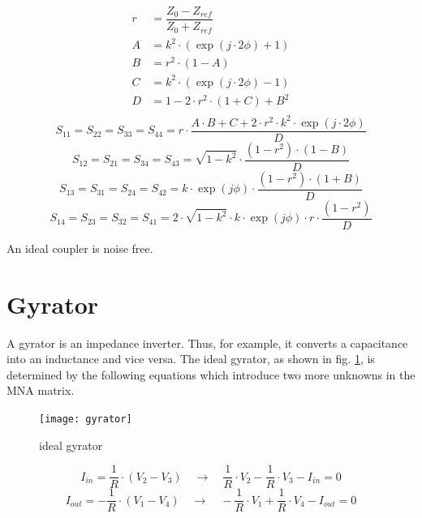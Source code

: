 \begin{align}
r &= \dfrac{Z_0-Z_{ref}}{Z_0+Z_{ref}} \\
A &= k^2 \cdot \left( \exp\left(j\cdot 2\phi\right)+1 \right) \\
B &= r^2 \cdot \left(1-A\right) \\
C &= k^2 \cdot \left( \exp\left(j\cdot 2\phi\right)-1 \right) \\
D &= 1 - 2\cdot r^2\cdot \left(1+C\right) + B^2 \\
\end{align}
\begin{equation}
S_{11} = S_{22} = S_{33} = S_{44} = r\cdot\dfrac{A\cdot B + C + 2\cdot r^2\cdot k^2\cdot\exp\left(j\cdot 2\phi\right)}{D}
\end{equation}
\begin{equation}
S_{12} = S_{21} = S_{34} = S_{43} = \sqrt{1-k^2}\cdot \dfrac{\left(1-r^2\right)\cdot \left(1-B\right)}{D}
\end{equation}
\begin{equation}
S_{13} = S_{31} = S_{24} = S_{42} = k\cdot\exp\left(j\phi\right)\cdot \dfrac{\left(1-r^2\right)\cdot \left(1+B\right)}{D}
\end{equation}
\begin{equation}
S_{14} = S_{23} = S_{32} = S_{41} = 2\cdot\sqrt{1-k^2}\cdot k\cdot\exp\left(j\phi\right)\cdot r\cdot \dfrac{\left(1-r^2\right)}{D}
\end{equation}

An ideal coupler is noise free.


\section{Gyrator}

A gyrator is an impedance inverter.  Thus, for example, it converts a
capacitance into an inductance and vice versa.
The ideal gyrator, as shown in fig. \ref{fig:gyrator}, is determined
by the following equations which introduce two more unknowns in the
MNA matrix.

\begin{figure}[ht]
\begin{center}
\texttt{[image: gyrator]}
\end{center}
\caption{ideal gyrator}
\label{fig:gyrator}
\end{figure}
\FloatBarrier

\begin{equation}
I_{in} = \frac{1}{R}\cdot\left(V_{2} - V_{3}\right)
\quad \rightarrow \quad
\frac{1}{R}\cdot V_{2} - \frac{1}{R}\cdot V_{3} - I_{in} = 0
\end{equation}
\begin{equation}
I_{out} = -\frac{1}{R}\cdot\left(V_{1} - V_{4}\right)
\quad \rightarrow \quad
-\frac{1}{R}\cdot V_{1} + \frac{1}{R}\cdot V_{4} - I_{out} = 0
\label{eq:gyrator}
\end{equation}

